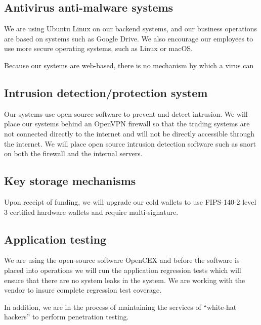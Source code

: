 \subsection{Antivirus anti-malware systems}

We are using Ubuntu Linux on our backend systems, and our business
operations are based on systems such as Google Drive.  We also
encourage our employees to use more secure operating systems, such as
Linux or macOS.

Because our systems are web-based, there is no mechanism by which a
virus can 

\subsection{Intrusion detection/protection system}

Our systems use open-source software to prevent and detect intrusion.
We will place our systems behind an OpenVPN firewall so that the
trading systems are not connected directly to the internet and will
not be directly accessible through the internet.  We will place open
source intrusion detection software such as snort on both the firewall
and the internal servers.

\subsection{Key storage mechanisms}
Upon receipt of funding, we will upgrade our cold wallets to use
FIPS-140-2 level 3 certified hardware wallets and require
multi-signature.


\subsection{Application testing}
We are using the open-source software OpenCEX and before the software is
placed into operations we will run the application regression tests
which will ensure that there are no system leaks in the system.  We
are working with the vendor to insure complete regression test
coverage.

In addition, we are in the process of maintaining the services of
``white-hat hackers'' to perform penetration testing.

